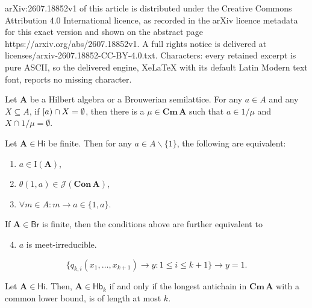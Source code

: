 \documentclass[10pt,a4paper]{amsart}
\def\ra{\rightarrow}
\def\up#1{\mathchoice{\bigl[#1\bigr)}{[#1)}{}{}}
\newcommand{\Cm}[1]{\mathbf{Cm}\, #1}
\newcommand{\Con}[1]{\mathbf{Con}\, #1}
\newcommand{\J}[1]{\mathcal{J}(#1)}
\newcommand{\alg}[1]{\mathbf{#1}}
\newcommand{\irr}[1]{\mathrm{I}(#1)}
\newcommand{\var}[1]{\mathsf{#1}}
\begin{document}
arXiv:2607.18852v1 of this article is distributed under the Creative Commons Attribution 4.0 International licence, as recorded in the arXiv licence metadata for this exact version and shown on the abstract page https://arxiv.org/abs/2607.18852v1. A full rights notice is delivered at licenses/arxiv-2607.18852-CC-BY-4.0.txt. Characters: every retained excerpt is pure ASCII, so the delivered engine, XeLaTeX with its default Latin Modern text font, reports no missing character.
\begin{theorem}\label{thm:PrimeFilter}
Let $\alg{A}$ be a Hilbert algebra or a Brouwerian semilattice.
For any $a\in A$ and any $X\subseteq A$, if $\up{a}\cap X = \emptyset$, then
there is a $\mu\in\Cm{\alg{A}}$ such that $a\in 1/\mu$ and
$X\cap 1/\mu = \emptyset$.
\end{theorem}  

\begin{theorem}\label{thm:irreducible-charact}
Let $\alg{A}\in\var{Hi}$ be finite. Then for any $a\in A\smallsetminus\{1\}$,
the following are equivalent:
\begin{enumerate}
\item $a\in \irr{\alg{A}}$,  
\item $\theta(1,a)\in \J{\Con{\alg{A}}}$,
\item $\forall m\in A: m\ra a\in\{1,a\}$. 
\end{enumerate}
If $\alg{A}\in\var{Br}$ is finite, then the conditions above are
further equivalent to
\begin{enumerate}
\setcounter{enumi}{3}  
\item $a$ is meet-irreducible. 
\end{enumerate}  
\end{theorem}

\begin{equation}\label{eq:Bk}\tag{$B_k$}
\{q_{k,i}(x_1,\dots,x_{k+1})\ra y: 1\leq i\leq k+1\}\ra y = 1.
\end{equation}

\begin{theorem}
Let $\alg{A}\in \var{Hi}$. Then, $\alg{A}\in\var{Hb}_k$ if and only if
the longest antichain in $\Cm{\alg{A}}$ with a common lower bound, is of length
at most $k$.   
\end{theorem}
\end{document}

